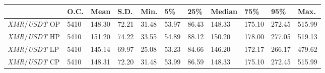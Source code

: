 \begin{tabular}{lllllllllll}
\toprule
 & \textbf{O.C.} & \textbf{Mean} & \textbf{S.D.} & \textbf{Min.} & \textbf{5\%} & \textbf{25\%} & \textbf{Median} & \textbf{75\%} & \textbf{95\%} & \textbf{Max.} \\
\midrule
\emph{XMR}/\emph{USDT} OP & 5410 & 148.30 & 72.21 & 31.48 & 53.97 & 86.43 & 148.33 & 175.10 & 272.45 & 515.99 \\
\emph{XMR}/\emph{USDT} HP & 5410 & 151.20 & 74.22 & 33.55 & 54.89 & 88.12 & 150.20 & 178.00 & 277.05 & 519.13 \\
\emph{XMR}/\emph{USDT} LP & 5410 & 145.14 & 69.97 & 25.08 & 53.23 & 84.66 & 146.20 & 172.17 & 266.17 & 479.62 \\
\emph{XMR}/\emph{USDT} CP & 5410 & 148.31 & 72.20 & 31.48 & 53.99 & 86.59 & 148.33 & 175.10 & 272.45 & 515.99 \\
\bottomrule
\end{tabular}
